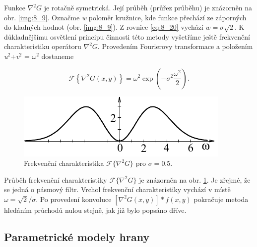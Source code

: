 Funkce $\nabla^2 G$ je rotačně symetrická. Její průběh (průřez průběhu) je znázorněn na obr. \ref{img:8_9}. Označme \textit{w} poloměr kružnice, kde funkce přechází ze záporných do kladných hodnot (obr. \ref{img:8_9}). Z rovnice \eqref{eq:8_20} vychází $w=\sigma\surd 2$. K důkladnějšímu osvětlení principu činnosti této metody vyšetříme ještě frekvenční charakteristiku operátoru $\nabla^2 G$. Provedením Fourierovy transformace a položením \textit{u}$^2$+\textit{v}$^2$ = $\omega^2$ dostaneme

\begin{equation} \label{eq:8_21}
    \mathscr{F} \left\{ \nabla^2 G(x, y) \right\} = \omega^2 \exp \left( - \sigma^2 \frac{\omega^2}{2} \right).
\end{equation}

\begin{figure}[th]
    \begin{center}
        \includegraphics[scale=0.9]{08_segmentace/images/img_8_10.pdf}
    \end{center}
    \caption{Frekvenční charakteristika $\mathscr{F}\{\nabla^2 G\}$ pro $\sigma = 0.5$.}
    \label{img:8_10}
\end{figure}

Průběh frekvenční charakteristiky $\mathscr{F}\{\nabla^2 G\}$ je znázorněn na obr. \ref{img:8_10}. Je zřejmé, že se jedná o pásmový filtr. Vrchol frekvenční charakteristiky vychází v místě $\omega = \surd 2 / \sigma$. Po provedení konvoluce $[\nabla^2 G(x, y)] \ast f(x, y)$ pokračuje metoda hledáním průchodů nulou stejně, jak již bylo popsáno dříve.

\subsection*{Parametrické modely hrany}

